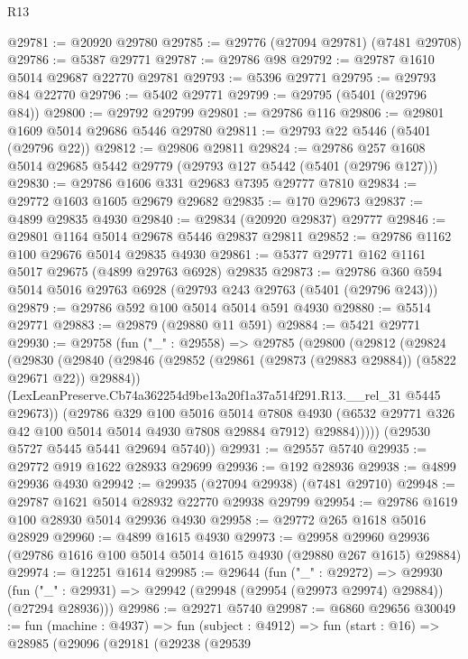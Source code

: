 \begin{lexlean}{R13}
\begin{coremodule}
@29781 := @20920 @29780
@29785 := @29776 (@27094 @29781) (@7481 @29708)
@29786 := @5387 @29771
@29787 := @29786 @98
@29792 := @29787 @1610 @5014 @29687 @22770 @29781
@29793 := @5396 @29771
@29795 := @29793 @84 @22770
@29796 := @5402 @29771
@29799 := @29795 (@5401 (@29796 @84))
@29800 := @29792 @29799
@29801 := @29786 @116
@29806 := @29801 @1609 @5014 @29686 @5446 @29780
@29811 := @29793 @22 @5446 (@5401 (@29796 @22))
@29812 := @29806 @29811
@29824 := @29786 @257 @1608 @5014 @29685 @5442 @29779 (@29793 @127 @5442 (@5401 (@29796 @127)))
@29830 := @29786 @1606 @331 @29683 @7395 @29777 @7810
@29834 := @29772 @1603 @1605 @29679 @29682
@29835 := @170 @29673
@29837 := @4899 @29835 @4930
@29840 := @29834 (@20920 @29837) @29777
@29846 := @29801 @1164 @5014 @29678 @5446 @29837 @29811
@29852 := @29786 @1162 @100 @29676 @5014 @29835 @4930
@29861 := @5377 @29771 @162 @1161 @5017 @29675 (@4899 @29763 @6928) @29835
@29873 := @29786 @360 @594 @5014 @5016 @29763 @6928 (@29793 @243 @29763 (@5401 (@29796 @243)))
@29879 := @29786 @592 @100 @5014 @5014 @591 @4930
@29880 := @5514 @29771
@29883 := @29879 (@29880 @11 @591)
@29884 := @5421 @29771
@29930 := @29758
    (fun ("_" : @29558) =>
    @29785
      (@29800
        (@29812
          (@29824
            (@29830
              (@29840
                (@29846 (@29852 (@29861 (@29873 (@29883 @29884)) (@5822 @29671 @22)) @29884))
                (LexLeanPreserve.Cb74a362254d9be13a20f1a37a514f291.R13.__rel_31 @5445 @29673))
              (@29786
                @329
                @100
                @5016
                @5014
                @7808
                @4930
                (@6532 @29771 @326 @42 @100 @5014 @5014 @4930 @7808 @29884 @7912)
                @29884)))))
      (@29530 @5727 @5445 @5441 @29694 @5740))
@29931 := @29557 @5740
@29935 := @29772 @919 @1622 @28933 @29699
@29936 := @192 @28936
@29938 := @4899 @29936 @4930
@29942 := @29935 (@27094 @29938) (@7481 @29710)
@29948 := @29787 @1621 @5014 @28932 @22770 @29938 @29799
@29954 := @29786 @1619 @100 @28930 @5014 @29936 @4930
@29958 := @29772 @265 @1618 @5016 @28929
@29960 := @4899 @1615 @4930
@29973 := @29958
    @29960
    @29936
    (@29786 @1616 @100 @5014 @5014 @1615 @4930 (@29880 @267 @1615) @29884)
@29974 := @12251 @1614
@29985 := @29644
    (fun ("_" : @29272) =>
    @29930 (fun ("_" : @29931) => @29942 (@29948 (@29954 (@29973 @29974) @29884)) (@27294 @28936)))
@29986 := @29271 @5740
@29987 := @6860 @29656
@30049 := fun (machine : @4937) =>
  fun (subject : @4912) =>
  fun (start : @16) =>
  @28985
    (@29096
      (@29181
        (@29238
          (@29539

\end{coremodule}
\end{lexlean}
